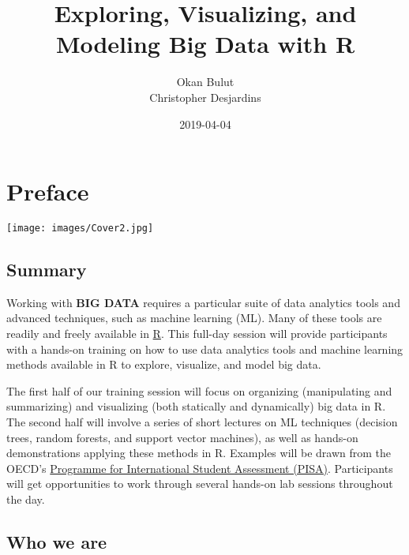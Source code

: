 \documentclass[]{book}
\title{Exploring, Visualizing, and Modeling Big Data with R}
\author{Okan Bulut \\ Christopher Desjardins}
\date{2019-04-04}
\begin{document}
\maketitle

{
\setcounter{tocdepth}{1}
\tableofcontents
}
\hypertarget{preface}{%
\chapter{Preface}\label{preface}}

\texttt{[image: images/Cover2.jpg]}

\hypertarget{summary}{%
\section{Summary}\label{summary}}

Working with \textbf{BIG DATA} requires a particular suite of data analytics tools and advanced techniques, such as machine learning (ML). Many of these tools are readily and freely available in \href{https://cran.r-project.org/}{R}. This full-day session will provide participants with a hands-on training on how to use data analytics tools and machine learning methods available in R to explore, visualize, and model big data.

The first half of our training session will focus on organizing (manipulating and summarizing) and visualizing (both statically and dynamically) big data in R. The second half will involve a series of short lectures on ML techniques (decision trees, random forests, and support vector machines), as well as hands-on demonstrations applying these methods in R. Examples will be drawn from the OECD's \href{http://www.oecd.org/pisa/}{Programme for International Student Assessment (PISA)}. Participants will get opportunities to work through several hands-on lab sessions throughout the day.

\hypertarget{who-we-are}{%
\section{Who we are}\label{who-we-are}}
\end{document}
